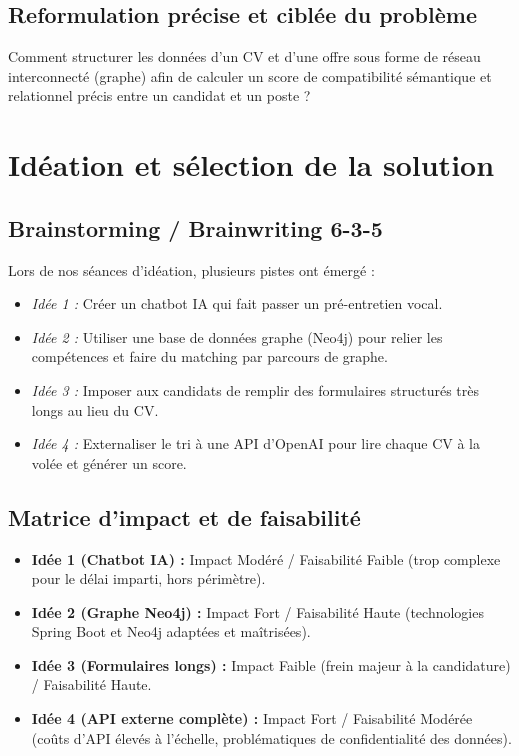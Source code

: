 \documentclass[12pt,a4paper]{report}
\begin{document}
\subsection{Reformulation précise et ciblée du problème}
Comment structurer les données d'un CV et d'une offre sous forme de réseau interconnecté (graphe) afin de calculer un score de compatibilité sémantique et relationnel précis entre un candidat et un poste ?

\section{Idéation et sélection de la solution}

\subsection{Brainstorming / Brainwriting 6-3-5}
Lors de nos séances d'idéation, plusieurs pistes ont émergé :
\begin{itemize}
    \item \textit{Idée 1 :} Créer un chatbot IA qui fait passer un pré-entretien vocal.
    \item \textit{Idée 2 :} Utiliser une base de données graphe (Neo4j) pour relier les compétences et faire du matching par parcours de graphe.
    \item \textit{Idée 3 :} Imposer aux candidats de remplir des formulaires structurés très longs au lieu du CV.
    \item \textit{Idée 4 :} Externaliser le tri à une API d'OpenAI pour lire chaque CV à la volée et générer un score.
\end{itemize}

\subsection{Matrice d'impact et de faisabilité}
\begin{itemize}
    \item \textbf{Idée 1 (Chatbot IA) :} Impact Modéré / Faisabilité Faible (trop complexe pour le délai imparti, hors périmètre).
    \item \textbf{Idée 2 (Graphe Neo4j) :} Impact Fort / Faisabilité Haute (technologies Spring Boot et Neo4j adaptées et maîtrisées).
    \item \textbf{Idée 3 (Formulaires longs) :} Impact Faible (frein majeur à la candidature) / Faisabilité Haute.
    \item \textbf{Idée 4 (API externe complète) :} Impact Fort / Faisabilité Modérée (coûts d'API élevés à l'échelle, problématiques de confidentialité des données).
\end{itemize}
\end{document}
